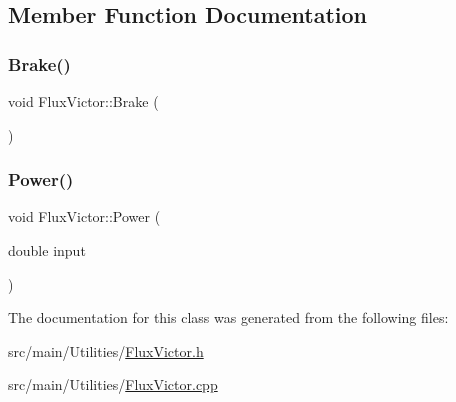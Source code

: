 \subsection{Member Function Documentation}
\mbox{\label{classFluxVictor_a6ea20f0e75817153eddf565a33df10c8}} 
\subsubsection{\texorpdfstring{Brake()}{Brake()}}
{\footnotesize\ttfamily void Flux\+Victor\+::\+Brake (\begin{DoxyParamCaption}{ }\end{DoxyParamCaption})}

\mbox{\label{classFluxVictor_a84f42f074e9f6d9a3d385f5993e7cc21}} 
\subsubsection{\texorpdfstring{Power()}{Power()}}
{\footnotesize\ttfamily void Flux\+Victor\+::\+Power (\begin{DoxyParamCaption}\item[{double}]{input }\end{DoxyParamCaption})}



The documentation for this class was generated from the following files\+:\begin{DoxyCompactItemize}
\item 
src/main/\+Utilities/\hyperlink{FluxVictor_8h}{Flux\+Victor.\+h}\item 
src/main/\+Utilities/\hyperlink{FluxVictor_8cpp}{Flux\+Victor.\+cpp}\end{DoxyCompactItemize}

